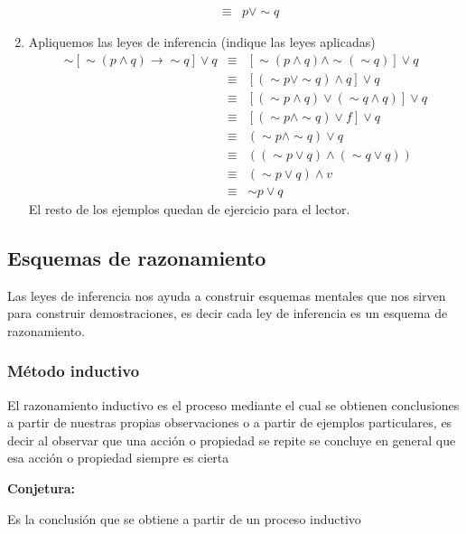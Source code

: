 \begin{enumerate}
\begin{eqnarray*}
 & \equiv & p\vee\sim q
\end{eqnarray*}
\item Apliquemos las leyes de inferencia (indique las leyes aplicadas)
\begin{eqnarray*}
\sim\left[\sim\left(p\wedge q\right)\rightarrow\sim q\right]\vee q & \equiv & \left[\sim\left(p\wedge q\right)\wedge\sim\left(\sim q\right)\right]\vee q\\
 & \equiv & \left[\left(\sim p\vee\sim q\right)\wedge q\right]\vee q\\
 & \equiv & \left[\left(\sim p\wedge q\right)\vee\left(\sim q\wedge q\right)\right]\vee q\\
 & \equiv & \left[\left(\sim p\wedge\sim q\right)\vee f\right]\vee q\\
 & \equiv & \left(\sim p\wedge\sim q\right)\vee q\\
 & \equiv & \left(\left(\sim p\vee q\right)\wedge\left(\sim q\vee q\right)\right)\\
 & \equiv & \left(\sim p\vee q\right)\wedge v\\
 & \equiv & \sim p\vee q
\end{eqnarray*}
El resto de los ejemplos quedan de ejercicio para el lector.
\end{enumerate}

\subsection{\label{subsec:Esquemas-de-razonamiento}Esquemas de razonamiento}

Las leyes de inferencia nos ayuda a construir esquemas mentales que
nos sirven para construir demostraciones, es decir cada ley de inferencia
es un esquema de razonamiento.

\subsubsection{Método inductivo}

El razonamiento inductivo es el proceso mediante el cual se obtienen
conclusiones a partir de nuestras propias observaciones o a partir
de ejemplos particulares, es decir al observar que una acción o propiedad
se repite se concluye en general que esa acción o propiedad siempre
es cierta 

\vspace*{-70pt}\begin{ideabox}{\bf Conjetura:}

Es la conclusión que se obtiene a partir de un proceso inductivo 

\end{ideabox}

